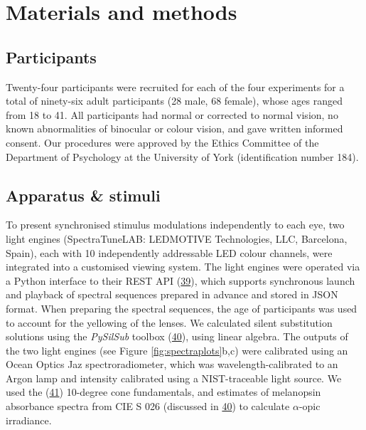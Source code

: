 \documentclass[
]{article}
\begin{document}
\hypertarget{materials-and-methods}{%
\section{Materials and methods}\label{materials-and-methods}}

\hypertarget{participants}{%
\subsection{Participants}\label{participants}}

Twenty-four participants were recruited for each of the four experiments for a total of ninety-six adult participants (28 male, 68 female), whose ages ranged from 18 to 41. All participants had normal or corrected to normal vision, no known abnormalities of binocular or colour vision, and gave written informed consent. Our procedures were approved by the Ethics Committee of the Department of Psychology at the University of York (identification number 184).

\hypertarget{apparatus-stimuli}{%
\subsection{Apparatus \& stimuli}\label{apparatus-stimuli}}

To present synchronised stimulus modulations independently to each eye, two light engines (SpectraTuneLAB: LEDMOTIVE Technologies, LLC, Barcelona, Spain), each with 10 independently addressable LED colour channels, were integrated into a customised viewing system. The light engines were operated via a Python interface to their REST API (\protect\hyperlink{ref-Martin2022}{39}), which supports synchronous launch and playback of spectral sequences prepared in advance and stored in JSON format. When preparing the spectral sequences, the age of participants was used to account for the yellowing of the lenses. We calculated silent substitution solutions using the \emph{PySilSub} toolbox (\protect\hyperlink{ref-Martin2023}{40}), using linear algebra. The outputs of the two light engines (see Figure \ref{fig:spectraplots}b,c) were calibrated using an Ocean Optics Jaz spectroradiometer, which was wavelength-calibrated to an Argon lamp and intensity calibrated using a NIST-traceable light source. We used the (\protect\hyperlink{ref-Stockman2000}{41}) 10-degree cone fundamentals, and estimates of melanopsin absorbance spectra from CIE S 026 (discussed in \protect\hyperlink{ref-Martin2023}{40}) to calculate \(\alpha\)-opic irradiance.
\end{document}
